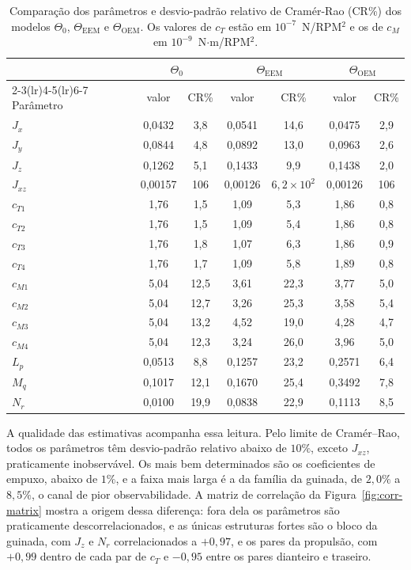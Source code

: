 \begin{table}[ht]
    \centering
    \caption{Comparação dos parâmetros e desvio-padrão relativo de Cramér-Rao (CR\%) dos modelos $\Theta_0$, $\Theta_{\text{EEM}}$ e $\Theta_{\text{OEM}}$. Os valores de $c_T$ estão em $10^{-7}$~N/RPM$^2$ e os de $c_M$ em $10^{-9}$~N$\cdot$m/RPM$^2$.}
    \label{tab:params-comp}
    \begin{tabular}{l cc cc cc}
    \toprule
    & \multicolumn{2}{c}{$\Theta_0$} & \multicolumn{2}{c}{$\Theta_{\text{EEM}}$} & \multicolumn{2}{c}{$\Theta_{\text{OEM}}$} \\
    \cmidrule(lr){2-3}\cmidrule(lr){4-5}\cmidrule(lr){6-7}
    Parâmetro & valor & CR\% & valor & CR\% & valor & CR\% \\
    \midrule
    $J_x$    & 0,0432 & 3,8 & 0,0541 & 14,6 & 0,0475 & 2,9 \\
    $J_y$    & 0,0844 & 4,8 & 0,0892 & 13,0 & 0,0963 & 2,6 \\
    $J_z$    & 0,1262 & 5,1 & 0,1433 & 9,9 & 0,1438 & 2,0 \\
    $J_{xz}$ & 0,00157 & 106 & 0,00126 & $6{,}2\times10^{2}$ & 0,00126 & 106 \\
    $c_{T1}$ & 1,76 & 1,5 & 1,09 & 5,3 & 1,86 & 0,8 \\
    $c_{T2}$ & 1,76 & 1,5 & 1,09 & 5,4 & 1,86 & 0,8 \\
    $c_{T3}$ & 1,76 & 1,8 & 1,07 & 6,3 & 1,86 & 0,9 \\
    $c_{T4}$ & 1,76 & 1,7 & 1,09 & 5,8 & 1,89 & 0,8 \\
    $c_{M1}$ & 5,04 & 12,5 & 3,61 & 22,3 & 3,77 & 5,0 \\
    $c_{M2}$ & 5,04 & 12,7 & 3,26 & 25,3 & 3,58 & 5,4 \\
    $c_{M3}$ & 5,04 & 13,2 & 4,52 & 19,0 & 4,28 & 4,7 \\
    $c_{M4}$ & 5,04 & 12,3 & 3,24 & 26,0 & 3,96 & 5,0 \\
    $L_p$    & 0,0513 & 8,8 & 0,1257 & 23,2 & 0,2571 & 6,4 \\
    $M_q$    & 0,1017 & 12,1 & 0,1670 & 25,4 & 0,3492 & 7,8 \\
    $N_r$    & 0,0100 & 19,9 & 0,0838 & 22,9 & 0,1113 & 8,5 \\
    \bottomrule
    \end{tabular}
\end{table}



{\color{blue}A qualidade das estimativas acompanha essa leitura. Pelo limite de Cramér--Rao, todos os parâmetros têm desvio-padrão relativo abaixo de $10\%$, exceto $J_{xz}$, praticamente inobservável. Os mais bem determinados são os coeficientes de empuxo, abaixo de $1\%$, e a faixa mais larga é a da família da guinada, de $2{,}0\%$ a $8{,}5\%$, o canal de pior observabilidade. A matriz de correlação da Figura~\ref{fig:corr-matrix} mostra a origem dessa diferença: fora dela os parâmetros são praticamente descorrelacionados, e as únicas estruturas fortes são o bloco da guinada, com $J_z$ e $N_r$ correlacionados a $+0{,}97$, e os pares da propulsão, com $+0{,}99$ dentro de cada par de $c_T$ e $-0{,}95$ entre os pares dianteiro e traseiro.}

